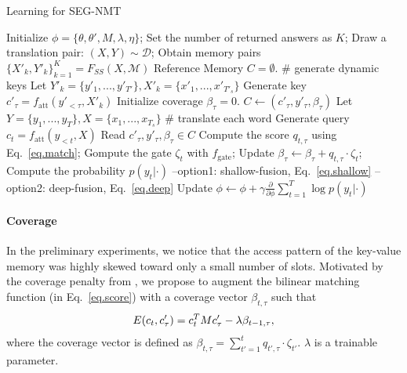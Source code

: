 \begin{algorithm}[H]
\caption{Learning for SEG-NMT}%
\label{algo2}
\begin{algorithmic}[1]
\small
{}
\State Initialize $\phi = \{\theta, \theta', M, \lambda, \eta\}$;
\State Set the number of returned answers as $K$;
\State Draw a translation pair: $(X, Y)\sim \mathcal{D}$;
\State Obtain memory pairs $\{X'_k, Y'_k\}_{k=1}^K = F_{SS}(X, \mathcal{M})$
\State Reference Memory $C=\emptyset$.
   \# generate dynamic keys
\State Let $Y'_k = \{y'_1, ..., y'_{T'}\}, X'_k = \{x'_1, ..., x'_{T'_s}\}$
\State Generate key $c'_\tau = f_{\text{att}}(y'_{<\tau}, X'_k)$
\State Initialize coverage $\beta_{\tau} = 0.$
\State $ C \leftarrow (c'_\tau, y'_\tau, \beta_{\tau})$
\EndFor 
\EndFor
\State Let $Y = \{y_1, ..., y_{T}\}, X = \{x_1, ..., x_{T_s}\}$
 \# translate each word
\State Generate query $c_t = f_{\text{att}}(y_{<t}, X)$
  Read $c'_\tau, y'_\tau,  \beta_{\tau} \in C$
\State Compute the score $q_{t, \tau}$ using Eq.~\ref{eq.match};
\State Gompute the gate $\zeta_t$ with $f_{\text{gate}}$;
\State Update $\beta_{\tau} \leftarrow \beta_{\tau} + q_{t, \tau}\cdot\zeta_t$;
\EndFor
\State Compute the probability $p(y_t|\cdot)$
\State \hspace{10pt} --option1: shallow-fusion, Eq.~\ref{eq.shallow}
\State  \hspace{10pt} --option2: deep-fusion, Eq.~\ref{eq.deep}
\EndFor 
\State Update $\phi \leftarrow \phi  +\gamma\frac{\partial}{\partial \phi} \sum_{t=1}^T\log p(y_t|\cdot)$
\EndWhile
\end{algorithmic}
\end{algorithm}

\paragraph{Coverage}

In the preliminary experiments, we notice that the access pattern of the key-value memory was highly skewed toward only a small number of slots. Motivated by the coverage penalty from \citep{tu2016modeling}, we propose to augment the bilinear matching function (in Eq.~\eqref{eq.score}) with a coverage vector $\beta_{t,\tau}$ such that
\vspace{-3pt}
\begin{align}
\label{eq.match}
     E(c_t, c'_\tau) = c_t^TMc'_\tau - \lambda \beta_{t-1, \tau},
\vspace{-3pt}
\end{align}
where the coverage vector is defined as 
$    \beta_{t, \tau}= \sum_{t'=1}^t q_{t', \tau}\cdot\zeta_{t'}$. $\lambda$ is a trainable parameter.


